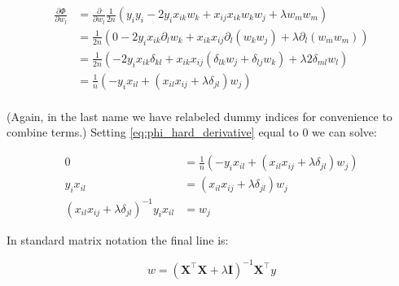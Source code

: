 \documentclass{article}
\begin{document}
\begin{equation}\label{eq:phi_hard_derivative}
\begin{split}
	\frac{\partial \Phi}{\partial w_l} & = \frac{\partial}{\partial w_l}\frac{1}{2n}\left(y_iy_i - 2y_ix_{ik}w_k + x_{ij}x_{ik}w_kw_j+ \lambda w_mw_m\right) \\
					   &= \frac{1}{2n} \left( 0 - 2y_ix_{ik}\partial_lw_k + x_{ik}x_{ij}\partial_l \left( w_kw_j \right) + \lambda \partial_l \left( w_mw_m \right) \right) \\
					   &=  \frac{1}{2n} \left(  - 2y_ix_{ik}\delta_{kl} + x_{ik}x_{ij} \left( \delta_{lk}w_j + \delta_{lj}w_k \right)+ \lambda 2 \delta_{ml}w_l \right) \\
					   &=  \frac{1}{n} \left( -y_ix_{il} + \left(x_{il}x_{ij} + \lambda  \delta_{jl}\right) w_j \right) \\
\end{split}
\end{equation}

(Again, in the last name we have relabeled dummy indices for convenience to combine terms.) Setting \ref{eq:phi_hard_derivative} equal to 0 we can solve:


\begin{equation}
\begin{split}
	0 & =  \frac{1}{n} \left( -y_ix_{il} + \left(x_{il}x_{ij} + \lambda  \delta_{jl}\right) w_j \right) \\
	y_ix_{il} &= \left(x_{il}x_{ij} + \lambda  \delta_{jl}\right) w_j \\
	\left(x_{il}x_{ij} + \lambda  \delta_{jl}\right)^{-1} y_ix_{il} &= w_j
\end{split}
\end{equation}

In standard matrix notation the final line is:

\begin{equation}\label{eq:analytic_w_star}
	w = \left(\bm{X}^\top \bm{X} + \lambda \bm{I} \right)^{-1}\bm{X}^\top y
\end{equation}
\end{document}
